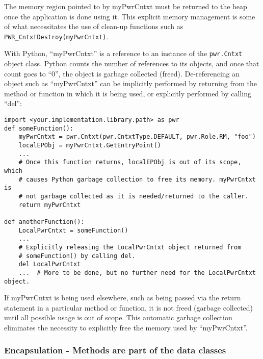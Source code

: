The memory region pointed to by myPwrCntxt must be returned to the heap once
the application is done using it. This explicit memory management is some of
what necessitates the use of clean-up functions such as
\texttt{PWR_CntxtDestroy(myPwrCntxt)}.

With Python, ``myPwrCntxt'' is a reference to an instance of the
\texttt{pwr.Cntxt} object class. Python counts the number of references to its
objects, and once that count goes to ``0'', the object is garbage collected
(freed). De-referencing an object such as ``myPwrCntxt'' can be implicitly
performed by returning from the method or function in which it is being used,
or explicitly performed by calling ``del'':

\begin{center}\begin{minipage}{.95\linewidth}\begin{lstlisting}
import <your.implementation.library.path> as pwr
def someFunction():
    myPwrCntxt = pwr.Cntxt(pwr.CntxtType.DEFAULT, pwr.Role.RM, "foo")
    localEPObj = myPwrCntxt.GetEntryPoint()
    ...
    # Once this function returns, localEPObj is out of its scope, which
    # causes Python garbage collection to free its memory. myPwrCntxt is
    # not garbage collected as it is needed/returned to the caller.
    return myPwrCntxt

def anotherFunction():
    LocalPwrCntxt = someFunction()
    ...
    # Explicitly releasing the LocalPwrCntxt object returned from
    # someFunction() by calling del.
    del LocalPwrCntxt
    ...  # More to be done, but no further need for the LocalPwrCntxt object.
\end{lstlisting}\end{minipage}\end{center}

If myPwrCntxt is being used elsewhere, such as being passed via the return
statement in a particular method or function, it is not freed (garbage
collected) until all possible usage is out of scope. This automatic garbage
collection eliminates the necessity to explicitly free the memory used by
``myPwrCntxt''.

\subsubsection{Encapsulation - Methods are part of the data classes}
\label{sec:PythonEncapsulation}

